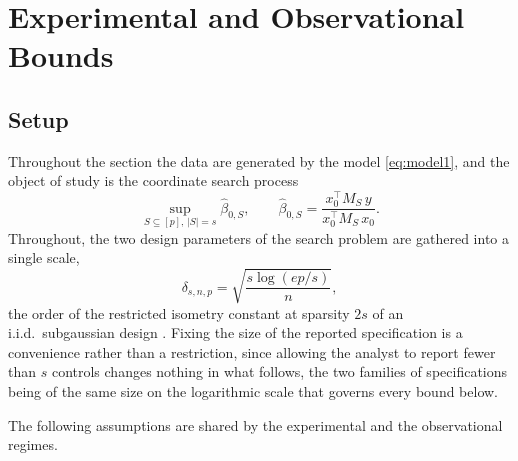 \section{Experimental and Observational Bounds}
\label{sec:bounds}


\subsection{Setup}
\label{sec:setup}


Throughout the section the data are generated by the model
\eqref{eq:model1}, and the object of study is the coordinate search process
\begin{equation}\label{eq:searched-sup}
        \sup_{S \subseteq [p],\, |S| = s} \hat \beta_{0, S},
        \qquad
        \hat \beta_{0, S} = \frac{x_0^\top M_S\, y}{x_0^\top M_S\, x_0}.
\end{equation}
Throughout, the two design parameters of the search problem are gathered
into a single scale,
\begin{equation}\label{eq:isometry-scale}
        \delta_{s,n,p} = \sqrt{\frac{s \log(ep/s)}{n}},
\end{equation}
the order of the restricted isometry constant at sparsity $2s$ of an
i.i.d.\ subgaussian design
\citep{candesTao2005decoding,baraniuk2008simple}. Fixing the size of the
reported specification is a convenience rather than a restriction, since
allowing the analyst to report fewer than $s$ controls changes nothing in
what follows, the two families of specifications being of the same size
on the logarithmic scale that governs every bound below.

The following assumptions are shared by the experimental and
the observational regimes.


